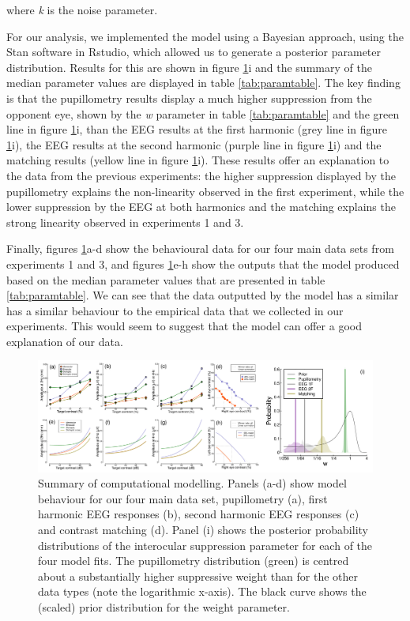 \documentclass[
]{article}
\begin{document}
where \emph{k} is the noise parameter.

For our analysis, we implemented the model using a Bayesian approach, using the Stan software in Rstudio, which allowed us to generate a posterior parameter distribution. Results for this are shown in figure \ref{fig:modelfigure}i and the summary of the median parameter values are displayed in table \ref{tab:paramtable}. The key finding is that the pupillometry results display a much higher suppression from the opponent eye, shown by the \emph{w} parameter in table \ref{tab:paramtable} and the green line in figure \ref{fig:modelfigure}i, than the EEG results at the first harmonic (grey line in figure \ref{fig:modelfigure}i), the EEG results at the second harmonic (purple line in figure \ref{fig:modelfigure}i) and the matching results (yellow line in figure \ref{fig:modelfigure}i). These results offer an explanation to the data from the previous experiments: the higher suppression displayed by the pupillometry explains the non-linearity observed in the first experiment, while the lower suppression by the EEG at both harmonics and the matching explains the strong linearity observed in experiments 1 and 3.

Finally, figures \ref{fig:modelfigure}a-d show the behavioural data for our four main data sets from experiments 1 and 3, and figures \ref{fig:modelfigure}e-h show the outputs that the model produced based on the median parameter values that are presented in table \ref{tab:paramtable}. We can see that the data outputted by the model has a similar has a similar behaviour to the empirical data that we collected in our experiments. This would seem to suggest that the model can offer a good explanation of our data.

\begin{figure}

{\centering \includegraphics{Figures/modelfigure} 

}

\caption{Summary of computational modelling. Panels (a-d) show model behaviour for our four main data set, pupillometry (a), first harmonic EEG responses (b), second harmonic EEG responses (c) and contrast matching (d). Panel (i) shows the posterior probability distributions of the interocular suppression parameter for each of the four model fits. The pupillometry distribution (green) is centred about a substantially higher suppressive weight than for the other data types (note the logarithmic x-axis). The black curve shows the (scaled) prior distribution for the weight parameter.}\label{fig:modelfigure}
\end{figure}
\end{document}
